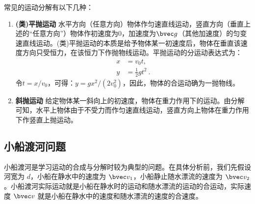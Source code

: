 常见的运动分解有以下几种：
\begin{enumerate}
\item \textbf{ (类)平抛运动} 水平方向（任意方向）物体作匀速直线运动，竖直方向（垂直上述的“任意方向”）物体作初速度为$0$，加速度为$\bvec g$（其他加速度）的匀变速直线运动。(类)平抛运动的本质是给予物体某一初速度后，物体在垂直该速度方向只受恒力，在该恒力下作抛物线运动。平抛运动的分运动表达式为：
\begin{equation}
\begin{aligned}
x&=v_0t,\\
y&=\frac{1}{2}gt^2~.
\end{aligned}
\end{equation} 令$t=x/v_0$，可得：$y=gx^2/(2v_0^2)$，因此，物体的合运动确为一抛物线。
\item \textbf{斜抛运动} 给定物体某一斜向上的初速度，物体在重力作用下的运动。由分解可知，水平上物体由于不受力而作匀速直线运动，竖直方向上物体在重力作用下作竖直上抛运动。
\end{enumerate}




\subsection{小船渡河问题}

小船渡河是学习运动的合成与分解时较为典型的问题。在具体分析前，我们先假设河宽为 $d$，小船在静水中的速度为 $\bvec v_1$，小船静止随水漂流的速度为 $\bvec v_2$。小船渡河实际运动就是小船在静水时的运动和随水漂流的运动的合运动，实际速度 $\bvec v$ 就是小船在静水中的速度和随水漂流的速度的合速度。


